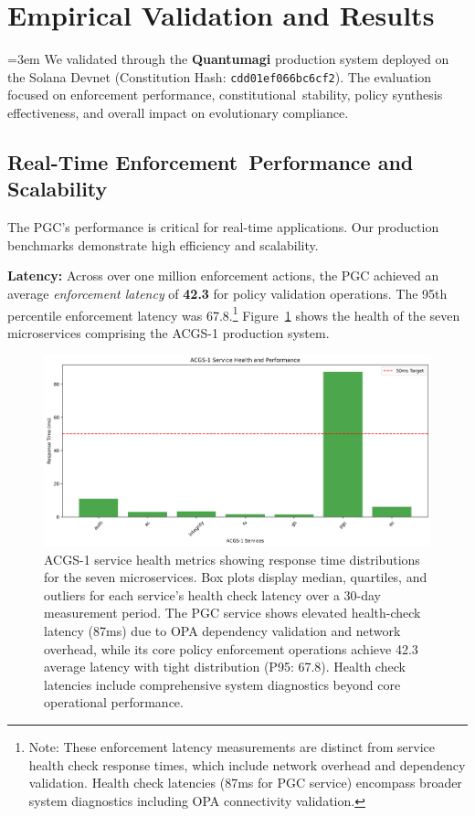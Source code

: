 \section{Empirical Validation and Results}\label{sec:results}
{\emergencystretch=3em
We validated \acgs{} through the \textbf{Quantumagi} production system deployed on the Solana Devnet (Constitution Hash: \texttt{cdd01ef0\allowbreak{}66bc6cf2}). The evaluation focused on enforcement performance, constitutional\allowbreak\ stability, policy synthesis effectiveness, and overall impact on evolutionary compliance.
}

{\sloppy
\subsection{Real-Time Enforcement\allowbreak\ Performance and Scalability}
The PGC's performance is critical for real-time applications. Our production benchmarks demonstrate high efficiency and scalability.
}

\textbf{Latency:} Across over one million enforcement actions, the PGC achieved an average \emph{enforcement latency} of \textbf{42.3\ms{}} for policy validation operations. The 95th percentile enforcement latency was 67.8\ms{}.\footnote{Note: These enforcement latency measurements are distinct from service health check response times, which include network overhead and dependency validation. Health check latencies (87ms for PGC service) encompass broader system diagnostics including OPA connectivity validation.} Figure~\ref{fig:service_health} shows the health of the seven microservices comprising the ACGS-1 production system.

\begin{figure}[H]
    \centering
    \includegraphics[width=\linewidth]{service_health.png}
    \caption{ACGS-1 service health metrics showing response time distributions for the seven microservices. Box plots display median, quartiles, and outliers for each service's health check latency over a 30-day measurement period. The PGC service shows elevated health-check latency (87ms) due to OPA dependency validation and network overhead, while its core policy enforcement operations achieve 42.3\ms{} average latency with tight distribution (P95: 67.8\ms{}). Health check latencies include comprehensive system diagnostics beyond core operational performance.}\label{fig:service_health}
\end{figure}

